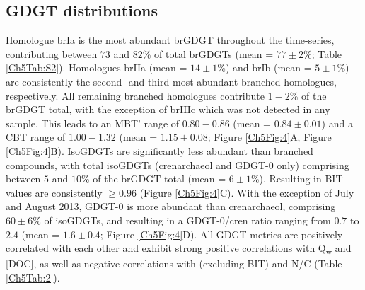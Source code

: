 \subsection{GDGT distributions}

Homologue brIa is the most abundant brGDGT throughout the time-series, contributing between $73$ and $82$\% of total brGDGTs (mean = $77 \pm 2$\%; Table \ref{Ch5Tab:S2}). Homologues brIIa (mean = $14 \pm 1$\%) and brIb (mean = $5 \pm 1$\%) are consistently the second- and third-most abundant branched homologues, respectively. All remaining branched homologues contribute $1-2$\% of the brGDGT total, with the exception of brIIIc which was not detected in any sample. This leads to an MBT' range of $0.80 - 0.86$ (mean = $0.84 \pm 0.01$) and a CBT range of $1.00 - 1.32$ (mean = $1.15 \pm 0.08$; Figure \ref{Ch5Fig:4}A, Figure \ref{Ch5Fig:4}B). IsoGDGTs are significantly less abundant than branched compounds, with total isoGDGTs (crenarchaeol and GDGT-0 only) comprising between $5$ and $10$\% of the brGDGT total (mean = $6 \pm 1$\%). Resulting in BIT values are consistently $\geq 0.96$ (Figure \ref{Ch5Fig:4}C). With the exception of July and August 2013, GDGT-0 is more abundant than crenarchaeol, comprising $60 \pm 6$\% of isoGDGTs, and resulting in a GDGT-0/cren ratio ranging from $0.7$ to $2.4$ (mean = $1.6 \pm 0.4$; Figure \ref{Ch5Fig:4}D). All GDGT metrics are positively correlated with each other and exhibit strong positive correlations with Q\textsubscript{w} and [DOC], as well as negative correlations with  (excluding BIT) and N/C (Table \ref{Ch5Tab:2}).

